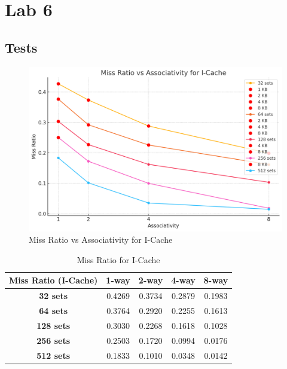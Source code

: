 \documentclass{article}
\begin{document}
\section{Lab 6}
\subsection{Tests}

\begin{figure}[H]
	\centering
	\includegraphics[scale=0.5]{icache.png}
	\caption{Miss Ratio vs Associativity for I-Cache}
	\label{fig:icache}
\end{figure}
\begin{table}[h]
	\centering
	\begin{tabular}{|c|c|c|c|c|}
		\hline
		\textbf{Miss Ratio (I-Cache)} & \textbf{1-way} & \textbf{2-way} & \textbf{4-way} & \textbf{8-way} \\ \hline
		\textbf{32 sets}  &       0.4269      &       0.3734     &      0.2879       &       0.1983      \\ \hline
		\textbf{64 sets}  &        0.3764    &       0.2920     &       0.2255      &      0.1613      \\ \hline
		\textbf{128 sets} &       0.3030      &       0.2268     &        0.1618    &      0.1028       \\ \hline
		\textbf{256 sets} &        0.2503     &      0.1720       &      0.0994       &       0.0176      \\ \hline
		\textbf{512 sets} &       0.1833     &      0.1010      &       0.0348      &      0.0142      \\ \hline
	\end{tabular}
	\caption{Miss Ratio for I-Cache}
	\label{tab:I-Cache}
\end{table}
\end{document}
